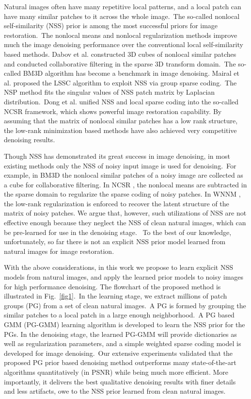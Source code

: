 Natural images often have many repetitive local patterns, and a local patch can have many similar patches to it across the whole image.\ The so-called nonlocal self-similarity (NSS) prior is among the most successful priors for image restoration.\ The nonlocal means \cite{nlm} and nonlocal regularization \cite{nlr} methods improve much the image denoising performance over the conventional local self-similarity based methods. Dabov et al. \cite{bm3d} constructed 3D cubes of nonlocal similar patches and conducted collaborative filtering in the sparse 3D transform domain.\ The so-called BM3D algorithm has become a benchmark in image denoising. Mairal et al. \cite{lssc} proposed the LSSC algorithm to exploit NSS via group sparse coding.\ The NSP \cite{nsp} method fits the singular values of NSS patch matrix by Laplacian distribution.\ Dong et al. \cite{ncsr} unified NSS and local sparse coding into the so-called NCSR framework, which shows powerful image restoration capability. By assuming that the matrix of nonlocal similar patches has a low rank structure, the low-rank minimization based methods \cite{nnm,wnnm} have also achieved very competitive denoising results. 

Though NSS has demonstrated its great success in image denoising, in most existing methods only the NSS of noisy input image is used for denoising.\ For example, in BM3D \cite{bm3d} the nonlocal similar patches of a noisy image are collected as a cube for collaborative filtering. In NCSR \cite{ncsr}, the nonlocal means are subtracted in the sparse domain to regularize the sparse coding of noisy patches. In WNNM \cite{wnnm}, the low-rank regularization is enforced to recover the latent structure of the matrix of noisy patches. We argue that, however, such utilizations of NSS are not effective enough because they neglect the NSS of clean natural images, which can be pre-learned for use in the denoising stage. \ To the best of our knowledge, unfortunately, so far there is not an explicit NSS prior model learned from natural images for image restoration. 

With the above considerations, in this work we propose to learn explicit NSS models from natural images, and apply the learned prior models to noisy images for high performance denoising. The flowchart of the proposed method is illustrated in Fig.\ \ref{fig1}.\ In the learning stage, we extract millions of patch groups (PG) from a set of clean natural images.\ A PG is formed by grouping the similar patches to a local patch in a large enough neighborhood.\ A PG based GMM (PG-GMM) learning algorithm is developed to learn the NSS prior for the PGs. In the denoising stage, the learned PG-GMM will provide dictionaries as well as regularization parameters, and a simple weighted sparse coding model is developed for image denoising.\ Our extensive experiments validated that the proposed PG prior based denoising method outperforms many state-of-the-art algorithms quantitatively (in PSNR) while being much more efficient. More importantly, it delivers the best qualitative denoising results with finer details and less artifacts, owe to the NSS prior learned from clean natural images.   

